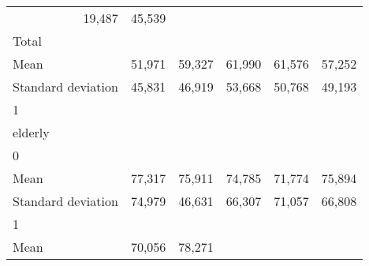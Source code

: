 \begin{tabular}{llllll}
  \multicolumn{1}{r}{19,487} &
  \multicolumn{1}{r}{45,539} \\
\multicolumn{1}{l}{\hspace{3em}Total} &
  \multicolumn{1}{|r}{} &
  \multicolumn{1}{r}{} &
  \multicolumn{1}{r}{} &
  \multicolumn{1}{r}{} &
  \multicolumn{1}{r}{} \\
\multicolumn{1}{l}{\hspace{4em}Mean} &
  \multicolumn{1}{|r}{51,971} &
  \multicolumn{1}{r}{59,327} &
  \multicolumn{1}{r}{61,990} &
  \multicolumn{1}{r}{61,576} &
  \multicolumn{1}{r}{57,252} \\
\multicolumn{1}{l}{\hspace{4em}Standard deviation} &
  \multicolumn{1}{|r}{45,831} &
  \multicolumn{1}{r}{46,919} &
  \multicolumn{1}{r}{53,668} &
  \multicolumn{1}{r}{50,768} &
  \multicolumn{1}{r}{49,193} \\
\multicolumn{1}{l}{\hspace{1em}1} &
  \multicolumn{1}{|r}{} &
  \multicolumn{1}{r}{} &
  \multicolumn{1}{r}{} &
  \multicolumn{1}{r}{} &
  \multicolumn{1}{r}{} \\
\multicolumn{1}{l}{\hspace{2em}elderly} &
  \multicolumn{1}{|r}{} &
  \multicolumn{1}{r}{} &
  \multicolumn{1}{r}{} &
  \multicolumn{1}{r}{} &
  \multicolumn{1}{r}{} \\
\multicolumn{1}{l}{\hspace{3em}0} &
  \multicolumn{1}{|r}{} &
  \multicolumn{1}{r}{} &
  \multicolumn{1}{r}{} &
  \multicolumn{1}{r}{} &
  \multicolumn{1}{r}{} \\
\multicolumn{1}{l}{\hspace{4em}Mean} &
  \multicolumn{1}{|r}{77,317} &
  \multicolumn{1}{r}{75,911} &
  \multicolumn{1}{r}{74,785} &
  \multicolumn{1}{r}{71,774} &
  \multicolumn{1}{r}{75,894} \\
\multicolumn{1}{l}{\hspace{4em}Standard deviation} &
  \multicolumn{1}{|r}{74,979} &
  \multicolumn{1}{r}{46,631} &
  \multicolumn{1}{r}{66,307} &
  \multicolumn{1}{r}{71,057} &
  \multicolumn{1}{r}{66,808} \\
\multicolumn{1}{l}{\hspace{3em}1} &
  \multicolumn{1}{|r}{} &
  \multicolumn{1}{r}{} &
  \multicolumn{1}{r}{} &
  \multicolumn{1}{r}{} &
  \multicolumn{1}{r}{} \\
\multicolumn{1}{l}{\hspace{4em}Mean} &
  \multicolumn{1}{|r}{70,056} &
  \multicolumn{1}{r}{78,271} &

\end{tabular}
